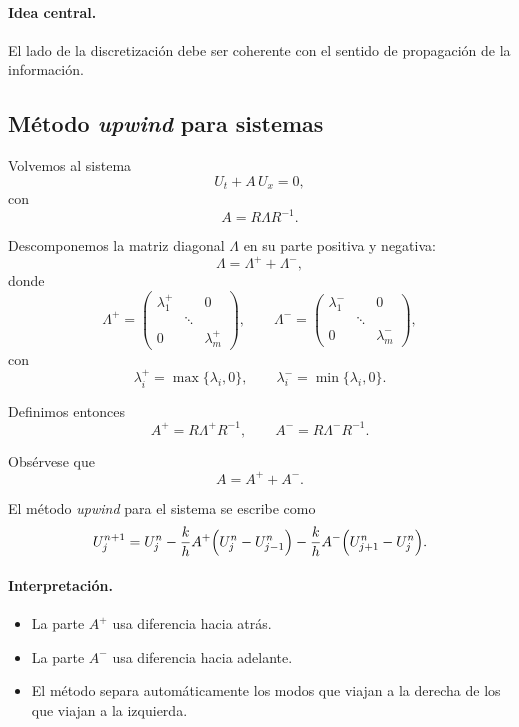 \paragraph{Idea central.}
El lado de la discretización debe ser coherente con el sentido de propagación de la información.

\subsection{Método \emph{upwind} para sistemas}

Volvemos al sistema
\[
U_t+A\,U_x=0,
\]
con
\[
A=R\Lambda R^{-1}.
\]

Descomponemos la matriz diagonal \(\Lambda\) en su parte positiva y negativa:
\[
\Lambda=\Lambda^+ + \Lambda^-,
\]
donde
\[
\Lambda^+=
\begin{pmatrix}
\lambda_1^+ &        & 0\\
            & \ddots &  \\
0           &        & \lambda_m^+
\end{pmatrix},
\qquad
\Lambda^-=
\begin{pmatrix}
\lambda_1^- &        & 0\\
            & \ddots &  \\
0           &        & \lambda_m^-
\end{pmatrix},
\]
con
\[
\lambda_i^+=\max\{\lambda_i,0\},
\qquad
\lambda_i^-=\min\{\lambda_i,0\}.
\]

Definimos entonces
\[
A^+=R\Lambda^+R^{-1},
\qquad
A^-=R\Lambda^-R^{-1}.
\]

Obsérvese que
\[
A=A^++A^-.
\]

El método \emph{upwind} para el sistema se escribe como
\[
U_j^{n+1}
=
U_j^n
-\frac{k}{h}A^+\Bigl(U_j^n-U_{j-1}^n\Bigr)
-\frac{k}{h}A^-\Bigl(U_{j+1}^n-U_j^n\Bigr).
\]

\paragraph{Interpretación.}
\begin{itemize}
    \item La parte \(A^+\) usa diferencia hacia atrás.
    \item La parte \(A^-\) usa diferencia hacia adelante.
    \item El método separa automáticamente los modos que viajan a la derecha de los que viajan a la izquierda.
\end{itemize}

